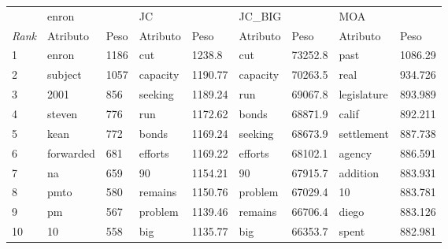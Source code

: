 \begin{tabular}{lllllllll}
	\toprule
	{}            & \multicolumn{2}{l}{enron} & \multicolumn{2}{l}{JC} & \multicolumn{2}{l}{JC\_BIG} & \multicolumn{2}{l}{MOA}                                              \\
	\textit{Rank} & Atributo                  & Peso                   & Atributo                    & Peso                    & Atributo & Peso    & Atributo    & Peso    \\
	\midrule
	1             & enron                     & 1186                   & cut                         & 1238.8                  & cut      & 73252.8 & past        & 1086.29 \\
	2             & subject                   & 1057                   & capacity                    & 1190.77                 & capacity & 70263.5 & real        & 934.726 \\
	3             & 2001                      & 856                    & seeking                     & 1189.24                 & run      & 69067.8 & legislature & 893.989 \\
	4             & steven                    & 776                    & run                         & 1172.62                 & bonds    & 68871.9 & calif       & 892.211 \\
	5             & kean                      & 772                    & bonds                       & 1169.24                 & seeking  & 68673.9 & settlement  & 887.738 \\
	6             & forwarded                 & 681                    & efforts                     & 1169.22                 & efforts  & 68102.1 & agency      & 886.591 \\
	7             & na                        & 659                    & 90                          & 1154.21                 & 90       & 67915.7 & addition    & 883.931 \\
	8             & pmto                      & 580                    & remains                     & 1150.76                 & problem  & 67029.4 & 10          & 883.781 \\
	9             & pm                        & 567                    & problem                     & 1139.46                 & remains  & 66706.4 & diego       & 883.126 \\
	10            & 10                        & 558                    & big                         & 1135.77                 & big      & 66353.7 & spent       & 882.981 \\
	\bottomrule
\end{tabular}


